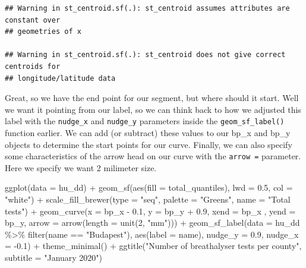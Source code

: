 \documentclass[
]{book}
\newenvironment{Shaded}{\begin{snugshade}}{\end{snugshade}}
\newcommand{\AttributeTok}[1]{\textcolor[rgb]{0.77,0.63,0.00}{#1}}
\newcommand{\DecValTok}[1]{\textcolor[rgb]{0.00,0.00,0.81}{#1}}
\newcommand{\FloatTok}[1]{\textcolor[rgb]{0.00,0.00,0.81}{#1}}
\newcommand{\FunctionTok}[1]{\textcolor[rgb]{0.00,0.00,0.00}{#1}}
\newcommand{\NormalTok}[1]{#1}
\newcommand{\SpecialCharTok}[1]{\textcolor[rgb]{0.00,0.00,0.00}{#1}}
\newcommand{\StringTok}[1]{\textcolor[rgb]{0.31,0.60,0.02}{#1}}
\begin{document}
\begin{verbatim}
## Warning in st_centroid.sf(.): st_centroid assumes attributes are constant over
## geometries of x

## Warning in st_centroid.sf(.): st_centroid does not give correct centroids for
## longitude/latitude data
\end{verbatim}

Great, so we have the end point for our segment, but where should it start. Well we want it pointing from our label, so we can think back to how we adjusted this label with the \texttt{nudge\_x} and \texttt{nudge\_y} parameters inside the \texttt{geom\_sf\_label()} function earlier. We can add (or subtract) these values to our bp\_x and bp\_y objects to determine the start points for our curve. Finally, we can also specify some characteristics of the arrow head on our curve with the \texttt{arrow\ =} parameter. Here we specify we want 2 milimeter size.

\begin{Shaded}
\begin{Highlighting}[]
\FunctionTok{ggplot}\NormalTok{(}\AttributeTok{data =}\NormalTok{ hu\_dd) }\SpecialCharTok{+} 
  \FunctionTok{geom\_sf}\NormalTok{(}\FunctionTok{aes}\NormalTok{(}\AttributeTok{fill =}\NormalTok{ total\_quantiles), }\AttributeTok{lwd =} \FloatTok{0.5}\NormalTok{, }\AttributeTok{col =} \StringTok{"white"}\NormalTok{) }\SpecialCharTok{+} 
  \FunctionTok{scale\_fill\_brewer}\NormalTok{(}\AttributeTok{type =} \StringTok{"seq"}\NormalTok{, }\AttributeTok{palette =} \StringTok{"Greens"}\NormalTok{, }\AttributeTok{name =} \StringTok{"Total tests"}\NormalTok{) }\SpecialCharTok{+} 
  \FunctionTok{geom\_curve}\NormalTok{(}\AttributeTok{x =}\NormalTok{ bp\_x }\SpecialCharTok{{-}} \FloatTok{0.1}\NormalTok{, }
             \AttributeTok{y =}\NormalTok{ bp\_y }\SpecialCharTok{+} \FloatTok{0.9}\NormalTok{, }
             \AttributeTok{xend =}\NormalTok{ bp\_x , }
             \AttributeTok{yend =}\NormalTok{ bp\_y, }
             \AttributeTok{arrow =} \FunctionTok{arrow}\NormalTok{(}\AttributeTok{length =} \FunctionTok{unit}\NormalTok{(}\DecValTok{2}\NormalTok{, }\StringTok{"mm"}\NormalTok{))) }\SpecialCharTok{+}
  \FunctionTok{geom\_sf\_label}\NormalTok{(}\AttributeTok{data =}\NormalTok{ hu\_dd }\SpecialCharTok{\%\textgreater{}\%} \FunctionTok{filter}\NormalTok{(name }\SpecialCharTok{==} \StringTok{"Budapest"}\NormalTok{), }
                \FunctionTok{aes}\NormalTok{(}\AttributeTok{label =}\NormalTok{ name), }
                \AttributeTok{nudge\_y =} \FloatTok{0.9}\NormalTok{, }
                \AttributeTok{nudge\_x =} \SpecialCharTok{{-}}\FloatTok{0.1}\NormalTok{) }\SpecialCharTok{+} 
  \FunctionTok{theme\_minimal}\NormalTok{() }\SpecialCharTok{+} 
  \FunctionTok{ggtitle}\NormalTok{(}\StringTok{"Number of breathalyser tests per county"}\NormalTok{, }\AttributeTok{subtitle =} \StringTok{"January 2020"}\NormalTok{)}
\end{Highlighting}
\end{Shaded}
\end{document}
